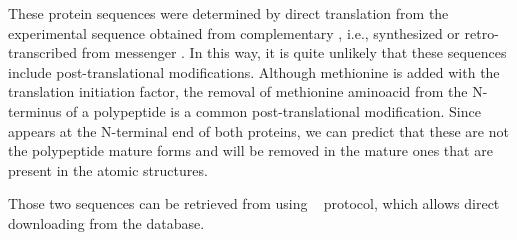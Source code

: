  
 These protein sequences were determined by direct translation from the experimental sequence obtained from complementary , i.e.,  synthesized or retro-transcribed from messenger . In this way, it is quite unlikely that these sequences include post-translational modifications. Although methionine is added with the translation  initiation factor, the removal of methionine aminoacid from the N-terminus of a polypeptide is a common post-translational modification. Since  appears at the N-terminal end of both proteins, we can predict that these are not the polypeptide mature forms and  will be removed in the mature ones that are present in the atomic structures. 
 
 Those two sequences can be retrieved from  using \scipion\  protocol, which allows direct downloading from the database.
 

